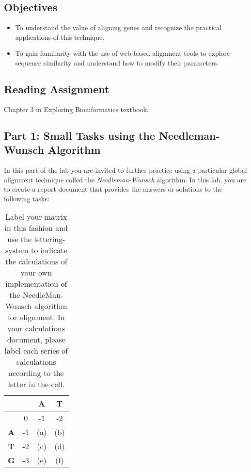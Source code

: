 \vspace*{-.1in}
\subsection*{Objectives}
\vspace*{-.1in}

\begin{itemize}
	\item To understand the value of aligning genes and recognize the practical applications of this technique.
	\item To gain familiarity with the use of web-based alignment tools to explore sequence similarity and understand how to modify their parameters.

\end{itemize}

\vspace*{-.1in}
\subsection*{Reading Assignment}
\vspace*{-.1in}
Chapter 3 in Exploring Bioinformatics textbook.

\vspace*{-.1in}
\subsection*{Part 1:  Small Tasks using the Needleman-Wunsch Algorithm}
\vspace*{-.1in} 


In this part of the lab you are invited to further practice using a particular global alignment technique called the \emph{Needleman-Wunsch} algorithm. In this lab, you are to create a report document that provides the answers or solutions to the following tasks:


\begin{table}[h!]
	\caption{Label your matrix in this fashion and use the lettering-system to indicate the calculations of your own implementation of the NeedleMan-Wunsch algorithm for alignment. In your calculations document, please label each series of calculations according to the letter in the cell.}
	\label{tab:matrix}
	\begin{center}
	\begin{tabular}{|c||c|c|c|}
	\hline
		&&{\color{red}\textbf{A}}&{\color{red}\textbf{T}}\\
		\hline\hline
		&0&-1&-2\\
		\hline
		{\color{red}\textbf{A}}&-1&(a)&(b)\\
		\hline
		{\color{red}\textbf{T}}&-2&(c)&(d)\\
		\hline
		{\color{red}\textbf{G}}&-3&(e)&(f)\\
	\hline
	\end{tabular}
	\end{center}
\end{table}



